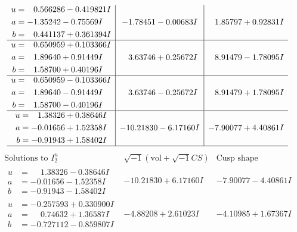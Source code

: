 \documentclass[1p]{elsarticle_modified}
\theoremstyle{definition}
\newcommand{\I}{\sqrt{-1}}
\begin{document}
$$\begin{array}{c|c|c}
\begin{aligned}
u &= \phantom{-}0.566286 - 0.419821 I \\
a &= -1.35242 - 0.75569 I \\
b &= \phantom{-}0.441137 + 0.361394 I\end{aligned}
 & -1.78451 - 0.00683 I & \phantom{-}1.85797 + 0.92831 I \\ \hline\begin{aligned}
u &= \phantom{-}0.650959 + 0.103366 I \\
a &= \phantom{-}1.89640 + 0.91449 I \\
b &= \phantom{-}1.58700 + 0.40196 I\end{aligned}
 & \phantom{-}3.63746 + 0.25672 I & \phantom{-}8.91479 - 1.78095 I \\ \hline\begin{aligned}
u &= \phantom{-}0.650959 - 0.103366 I \\
a &= \phantom{-}1.89640 - 0.91449 I \\
b &= \phantom{-}1.58700 - 0.40196 I\end{aligned}
 & \phantom{-}3.63746 - 0.25672 I & \phantom{-}8.91479 + 1.78095 I \\ \hline\begin{aligned}
u &= \phantom{-}1.38326 + 0.38646 I \\
a &= -0.01656 + 1.52358 I \\
b &= -0.91943 + 1.58402 I\end{aligned}
 & -10.21830 - 6.17160 I & -7.90077 + 4.40861 I\\
 \hline 
 \end{array}$$\newpage$$\begin{array}{c|c|c}  
\text{Solutions to }I^u_{2}& \I (\text{vol} + \sqrt{-1}CS) & \text{Cusp shape}\\
 \hline 
\begin{aligned}
u &= \phantom{-}1.38326 - 0.38646 I \\
a &= -0.01656 - 1.52358 I \\
b &= -0.91943 - 1.58402 I\end{aligned}
 & -10.21830 + 6.17160 I & -7.90077 - 4.40861 I \\ \hline\begin{aligned}
u &= -0.257593 + 0.330900 I \\
a &= \phantom{-}0.74632 + 1.36587 I \\
b &= -0.727112 - 0.859807 I\end{aligned}
 & -4.88208 + 2.61023 I & -4.10985 + 1.67367 I \\ \hline\begin{aligned}

\end{aligned}
\end{array}$$
\end{document}
